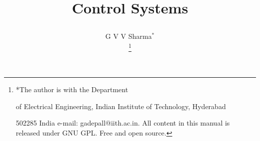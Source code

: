 \documentclass[journal,12pt,twocolumn]{IEEEtran}
\begin{document}



\def\putbox#1#2#3{\makebox[0in][l]{\makebox[#1][l]{}\raisebox{\baselineskip}[0in][0in]{\raisebox{#2}[0in][0in]{#3}}}}

     \def\rightbox#1{\makebox[0in][r]{#1}}

     \def\centbox#1{\makebox[0in]{#1}}

     \def\topbox#1{\raisebox{-\baselineskip}[0in][0in]{#1}}

     \def\midbox#1{\raisebox{-0.5\baselineskip}[0in][0in]{#1}}

\vspace{3cm}

\title{


Control Systems


}

\author{ G V V Sharma$^{*}$%

	\thanks{*The author is with the Department

		of Electrical Engineering, Indian Institute of Technology, Hyderabad

		502285 India e-mail:  gadepall@iith.ac.in. All content in this manual is released under GNU GPL.  Free and open source.}

	

}	







%

%


\end{document}
